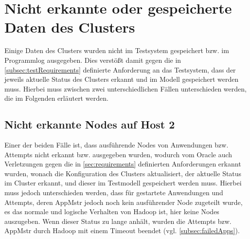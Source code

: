 \section{Nicht erkannte oder gespeicherte Daten des Clusters}
\label{sec:notDetectedData}

Einige Daten des Clusters wurden nicht im Testsystem gespeichert bzw. im Programmlog ausgegeben.
Dies verstößt damit gegen die in \cref{subsec:testRequirements} definierte Anforderung an das Testsystem, dass der jeweils aktuelle Status des Clusters erkannt und im Modell gespeichert werden muss.
Hierbei muss zwischen zwei unterschiedlichen Fällen unterschieden werden, die im Folgenden erläutert werden.

\subsection{Nicht erkannte Nodes auf Host 2}
\label{subsec:notDetectedHost2}

Einer der beiden Fälle ist, dass ausführende Nodes von Anwendungen bzw. Attempts nicht erkannt bzw. ausgegeben wurden, wodurch vom Oracle auch Verletzungen gegen die in \cref{sec:requirements} definierten Anforderungen erkannt wurden, wonach die Konfiguration des Clusters aktualisiert, der aktuelle Status im Cluster erkannt, und dieser im Testmodell gespeichert werden muss.
Hierbei muss jedoch unterschieden werden, dass für gestartete Anwendungen und Attempts, deren \gls{AppMstr} jedoch noch kein ausführender Node zugeteilt wurde, es das normale und logische Verhalten von Hadoop ist, hier keine Nodes auszugeben.
Wenn dieser Status zu lange anhält, wurden die Attempts bzw. \gls{AppMstr} durch Hadoop mit einem Timeout beendet (vgl. \cref{subsec:failedApps}).

